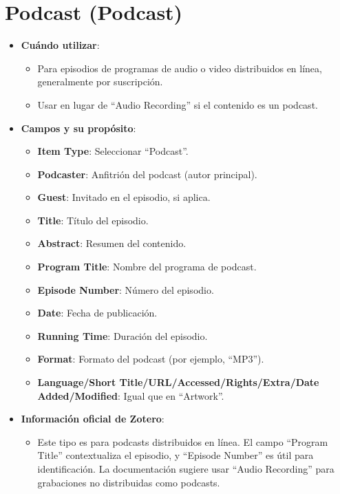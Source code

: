 \documentclass[
  jou,
  floatsintext,
  longtable,
  a4paper,
  nolmodern,
  notxfonts,
  notimes,
  12pt,
  colorlinks=true,linkcolor=blue,citecolor=blue,urlcolor=blue]{apa7}
\providecommand{\tightlist}{%
  \setlength{\itemsep}{0pt}\setlength{\parskip}{0pt}}
\begin{document}
\section{Podcast (Podcast)}\label{podcast-podcast}

\begin{itemize}
\tightlist
\item
  \textbf{Cuándo utilizar}:

  \begin{itemize}
  \tightlist
  \item
    Para episodios de programas de audio o video distribuidos en línea,
    generalmente por suscripción.
  \item
    Usar en lugar de ``Audio Recording'' si el contenido es un podcast.
  \end{itemize}
\item
  \textbf{Campos y su propósito}:

  \begin{itemize}
  \tightlist
  \item
    \textbf{Item Type}: Seleccionar ``Podcast''.
  \item
    \textbf{Podcaster}: Anfitrión del podcast (autor principal).
  \item
    \textbf{Guest}: Invitado en el episodio, si aplica.
  \item
    \textbf{Title}: Título del episodio.
  \item
    \textbf{Abstract}: Resumen del contenido.
  \item
    \textbf{Program Title}: Nombre del programa de podcast.
  \item
    \textbf{Episode Number}: Número del episodio.
  \item
    \textbf{Date}: Fecha de publicación.
  \item
    \textbf{Running Time}: Duración del episodio.
  \item
    \textbf{Format}: Formato del podcast (por ejemplo, ``MP3'').
  \item
    \textbf{Language/Short Title/URL/Accessed/Rights/Extra/Date
    Added/Modified}: Igual que en ``Artwork''.
  \end{itemize}
\item
  \textbf{Información oficial de Zotero}:

  \begin{itemize}
  \tightlist
  \item
    Este tipo es para podcasts distribuidos en línea. El campo ``Program
    Title'' contextualiza el episodio, y ``Episode Number'' es útil para
    identificación. La documentación sugiere usar ``Audio Recording''
    para grabaciones no distribuidas como podcasts.
  \end{itemize}
\end{itemize}
\end{document}
